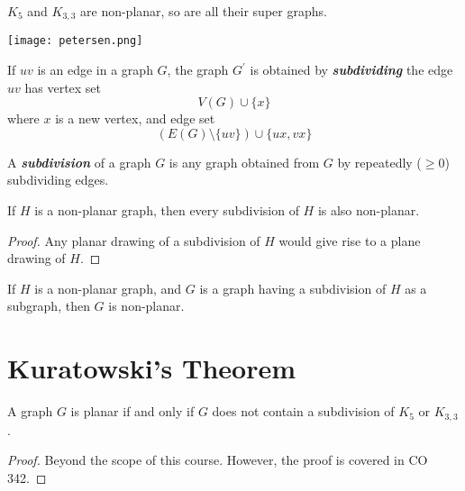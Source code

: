 $ K_5 $ and $ K_{3,3} $ are non-planar, so are all their super graphs.

\begin{center}
    \texttt{[image: petersen.png]}
\end{center}

\begin{defbox}
    \begin{definition}
        If $ uv $ is an edge in a graph $ G $, the graph $ G^{\prime} $
        is obtained by \textbf{\emph{subdividing}} the edge $ uv $
        has vertex set
        \[ V(G)\cup \{x\} \]
        where $ x $ is a new vertex, and edge set
        \[ (E(G)\setminus \{uv\})\cup \{ux,vx\} \]
    \end{definition}
\end{defbox}

\begin{defbox}
    \begin{definition}
        A \textbf{\emph{subdivision}} of a graph $ G $ is any graph
        obtained from $ G $ by repeatedly ($ \geqslant 0 $) subdividing edges.
    \end{definition}
\end{defbox}

\begin{thmbox}
    \begin{prop}
        If $ H $ is a non-planar graph, then every subdivision of $ H $
        is also non-planar.
    \end{prop}
\end{thmbox}
\begin{proof}
    Any planar drawing of a subdivision of $ H $ would give rise to
    a plane drawing of $ H $.
\end{proof}

\begin{thmbox}
    \begin{corollary}
        If $ H $ is a non-planar graph, and $ G $ is a graph
        having a subdivision of $ H $ as a subgraph, then $ G $
        is non-planar.
    \end{corollary}
\end{thmbox}

\section{Kuratowski's Theorem}
\begin{thmbox}
    \begin{theorem}
        A graph $ G $ is planar if and only if $ G $ does not
        contain a subdivision of $ K_5 $ or $ K_{3,3} $.
    \end{theorem}
\end{thmbox}
\begin{proof}
    Beyond the scope of this course. However, the proof is covered in
    CO 342.
\end{proof}

